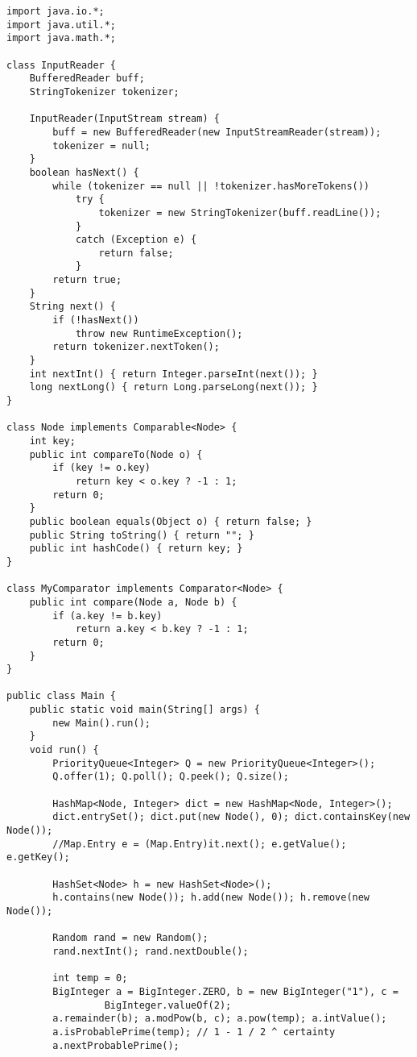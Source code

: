 \documentclass{article}
\begin{document}
\begin{lstlisting}
import java.io.*;
import java.util.*;
import java.math.*;

class InputReader {
    BufferedReader buff;
    StringTokenizer tokenizer;

    InputReader(InputStream stream) {
        buff = new BufferedReader(new InputStreamReader(stream));
        tokenizer = null;
    }
    boolean hasNext() {
        while (tokenizer == null || !tokenizer.hasMoreTokens())
            try {
                tokenizer = new StringTokenizer(buff.readLine());
            }
            catch (Exception e) {
                return false;
            }
        return true;
    }
    String next() {
        if (!hasNext())
            throw new RuntimeException();
        return tokenizer.nextToken();
    }
    int nextInt() { return Integer.parseInt(next()); }
    long nextLong() { return Long.parseLong(next()); }
}

class Node implements Comparable<Node> {
    int key;
    public int compareTo(Node o) {
        if (key != o.key)
            return key < o.key ? -1 : 1;
        return 0;
    }
    public boolean equals(Object o) { return false; }
    public String toString() { return ""; }
    public int hashCode() { return key; }
}

class MyComparator implements Comparator<Node> {
    public int compare(Node a, Node b) {
        if (a.key != b.key)
            return a.key < b.key ? -1 : 1;
        return 0;
    }
}

public class Main {
    public static void main(String[] args) {
        new Main().run();
    }
    void run() {
        PriorityQueue<Integer> Q = new PriorityQueue<Integer>();
        Q.offer(1); Q.poll(); Q.peek(); Q.size();

        HashMap<Node, Integer> dict = new HashMap<Node, Integer>();
        dict.entrySet(); dict.put(new Node(), 0); dict.containsKey(new Node());
        //Map.Entry e = (Map.Entry)it.next(); e.getValue(); e.getKey();

        HashSet<Node> h = new HashSet<Node>();
        h.contains(new Node()); h.add(new Node()); h.remove(new Node());

        Random rand = new Random();
        rand.nextInt(); rand.nextDouble();

        int temp = 0;
        BigInteger a = BigInteger.ZERO, b = new BigInteger("1"), c =
                 BigInteger.valueOf(2);
        a.remainder(b); a.modPow(b, c); a.pow(temp); a.intValue();
        a.isProbablePrime(temp); // 1 - 1 / 2 ^ certainty
        a.nextProbablePrime();


\end{lstlisting}
\end{document}
